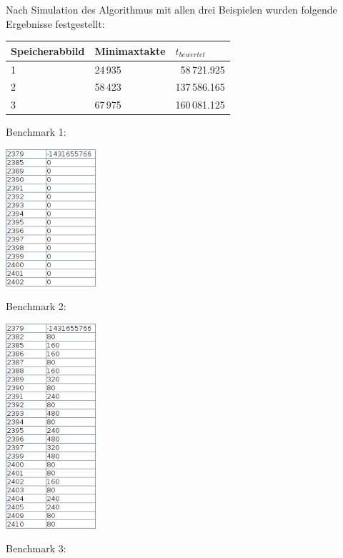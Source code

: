 Nach Simulation des Algorithmus mit allen drei Beispielen wurden folgende Ergebnisse festgestellt:

\begin{center}
    \begin{tabular}{|l|l|r|}
        \hline
        Speicherabbild & Minimaxtakte & \multicolumn{1}{l|}{$t_{bewertet}$} \\
        \hline
        \hline
        1 & 24\,935 & 58\,721.925 \\
        \hline
        2 & 58\,423 & 137\,586.165 \\
        \hline
        3 & 67\,975 & 160\,081.125 \\
        \hline
    \end{tabular}
\end{center}

\begin{multicols}{3}
    Benchmark 1:
    
    \includegraphics[width=0.25\textwidth]{dokumentation/res/bench1_result.png}
    \vfill
    \columnbreak
    
    Benchmark 2:
    
    \includegraphics[width=0.25\textwidth]{dokumentation/res/bench2_result.png}
    \vfill
    \columnbreak
    
    Benchmark 3:
    

\end{multicols}
